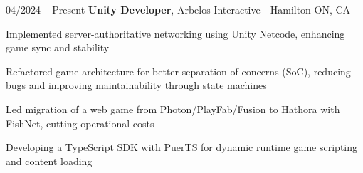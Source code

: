 \begin{twocolentry}{
    04/2024 – Present
}
\fontsize{11 pt}{11 pt}\textbf{Unity Developer}, Arbelos Interactive - Hamilton ON, CA \end{twocolentry}

\vspace{0.10 cm}
\begin{onecolentry}
   \begin{highlights}
       \item Implemented server-authoritative networking using Unity Netcode, enhancing game sync and stability
       \item Refactored game architecture for better separation of concerns (SoC), reducing bugs and improving maintainability through state machines
       \item Led migration of a web game from Photon/PlayFab/Fusion to Hathora with FishNet, cutting operational costs
       \item Developing a TypeScript SDK with PuerTS for dynamic runtime game scripting and content loading
   \end{highlights}
\end{onecolentry}